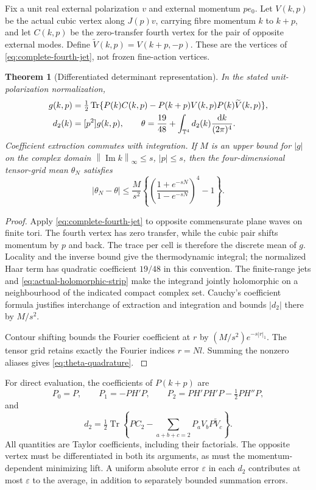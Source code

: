 \documentclass[11pt,oneside,openany]{book}
\newtheorem{theorem}{Theorem}[chapter]
\theoremstyle{definition}
\theoremstyle{remark}
\newcommand{\T}{\mathbb T}
\newcommand{\dd}{\mathrm d}
\newcommand{\Tr}{\operatorname{Tr}}
\newcommand{\norm}[1]{\left\lVert#1\right\rVert}
\newcommand{\src}[2]{\cite[#2]{#1}}
\begin{document}
Fix a unit real external polarization $v$ and external momentum $pe_0$.
Let $V(k,p)$ be the actual cubic vertex along $J(p)v$, carrying fibre
momentum $k$ to $k+p$, and let $C(k,p)$ be the zero-transfer fourth
vertex for the pair of opposite external modes. Define
$\widetilde V(k,p)=V(k+p,-p)$. These are the vertices of
\cref{eq:complete-fourth-jet}, not frozen fine-action vertices.

\begin{theorem}[Differentiated determinant representation]
\label{thm:theta-integral}
In the stated unit-polarization normalization,
\begin{align}
 g(k,p)&=\tfrac12\Tr\{P(k)C(k,p)
       -P(k+p)V(k,p)P(k)\widetilde V(k,p)\},\notag\\
 d_2(k)&=[p^2]g(k,p),\qquad
 \theta=\frac{19}{48}
           +\int_{\T^4}d_2(k)\frac{\dd k}{(2\pi)^4}.
 \label{eq:actual-theta}
\end{align}
Coefficient extraction commutes with integration. If $M$ is an upper
bound for $|g|$ on the complex domain
$\norm{\operatorname{Im}k}_\infty\le s$, $|p|\le s$, then the
four-dimensional tensor-grid mean $\theta_N$ satisfies
\begin{equation}\label{eq:theta-quadrature}
 |\theta_N-\theta|\le\frac{M}{s^2}
 \left\{\left(\frac{1+e^{-sN}}{1-e^{-sN}}\right)^4-1\right\}.
\end{equation}
\end{theorem}
\begin{proof}
Apply \cref{eq:complete-fourth-jet} to opposite commensurate plane waves
on finite tori. The fourth vertex has zero transfer, while the cubic
pair shifts momentum by $p$ and back. The trace per cell is therefore
the discrete mean of $g$. Locality and the inverse bound give the
thermodynamic integral; the normalized Haar term has quadratic
coefficient $19/48$ in this convention. The finite-range jets and
\cref{eq:actual-holomorphic-strip} make the integrand jointly
holomorphic on a neighbourhood of the indicated compact complex set.
Cauchy's coefficient formula justifies interchange of extraction and
integration and bounds $|d_2|$ there by $M/s^2$.

Contour shifting bounds the Fourier coefficient at $r$ by
$(M/s^2)e^{-s|r|_1}$. The tensor grid retains exactly the Fourier
indices $r=Nl$. Summing the nonzero aliases gives
\cref{eq:theta-quadrature}. \src{F12}{V5}
\end{proof}
For direct evaluation, the coefficients of $P(k+p)$ are
\[
 P_0=P,\qquad P_1=-PH'P,\qquad
 P_2=PH'PH'P-\tfrac12PH''P,
\]
and
\[
 d_2=\tfrac12\Tr\left\{PC_2-
             \sum_{a+b+c=2}P_aV_bP\widetilde V_c\right\}.
\]
All quantities are Taylor coefficients, including their factorials.
The opposite vertex must be differentiated in both its arguments, as
must the momentum-dependent minimizing lift. A uniform absolute error
$\varepsilon$ in each $d_2$ contributes at most $\varepsilon$ to the
average, in addition to separately bounded summation errors.
\end{document}
